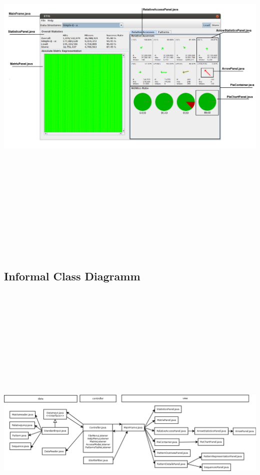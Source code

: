 \includegraphics[angle=90,height=700px]{gui/classresp1.png}
\subsection{Informal Class Diagramm}
\includegraphics[angle=90,height=560px]{gui/comm.png} 